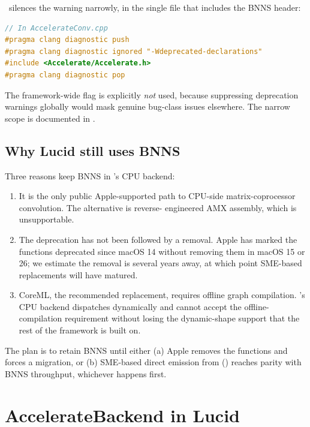 \Lucid\ silences the warning narrowly, in the single file that
includes the BNNS header:

\begin{lstlisting}[style=lucidcpp,language=C++]
// In AccelerateConv.cpp
#pragma clang diagnostic push
#pragma clang diagnostic ignored "-Wdeprecated-declarations"
#include <Accelerate/Accelerate.h>
#pragma clang diagnostic pop
\end{lstlisting}

The framework-wide  flag is
explicitly \emph{not} used, because suppressing deprecation
warnings globally would mask genuine bug-class issues elsewhere.
The narrow scope is documented in .

\subsection{Why Lucid still uses BNNS}
\label{ssec:accelerate:bnns_why}

Three reasons keep BNNS in \Lucid's CPU backend:

\begin{enumerate}
  \item It is the only public Apple-supported path to CPU-side
    matrix-coprocessor convolution. The alternative is reverse-
    engineered AMX assembly, which is unsupportable.
  \item The deprecation has not been followed by a removal. Apple
    has marked the functions deprecated since macOS 14 without
    removing them in macOS 15 or 26; we estimate the removal is
    several years away, at which point SME-based replacements will
    have matured.
  \item CoreML, the recommended replacement, requires offline graph
    compilation. \Lucid's CPU backend dispatches dynamically and
    cannot accept the offline-compilation requirement without
    losing the dynamic-shape support that the rest of the framework
    is built on.
\end{enumerate}

The plan is to retain BNNS until either (a) Apple removes the
functions and forces a migration, or (b) SME-based direct emission
from  () reaches parity
with BNNS throughput, whichever happens first.

\section{AccelerateBackend in Lucid}
\label{sec:accelerate:lucid_use}

